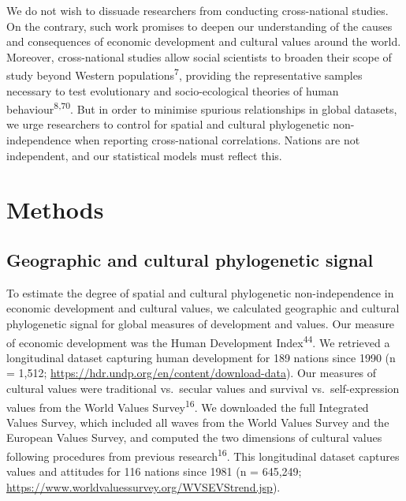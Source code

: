 \documentclass[english,man,floatsintext]{apa6}
\begin{document}
We do not wish to dissuade researchers from conducting cross-national studies. On the contrary, such work promises to deepen our understanding of the causes and consequences of economic development and cultural values around the world. Moreover, cross-national studies allow social scientists to broaden their scope of study beyond Western populations\textsuperscript{7}, providing the representative samples necessary to test evolutionary and socio-ecological theories of human behaviour\textsuperscript{8,70}. But in order to minimise spurious relationships in global datasets, we urge researchers to control for spatial and cultural phylogenetic non-independence when reporting cross-national correlations. Nations are not independent, and our statistical models must reflect this.

\hypertarget{methods}{%
\section{Methods}\label{methods}}

\hypertarget{geographic-and-cultural-phylogenetic-signal}{%
\subsection{Geographic and cultural phylogenetic signal}\label{geographic-and-cultural-phylogenetic-signal}}

To estimate the degree of spatial and cultural phylogenetic non-independence in economic development and cultural values, we calculated geographic and cultural phylogenetic signal for global measures of development and values. Our measure of economic development was the Human Development Index\textsuperscript{44}. We retrieved a longitudinal dataset capturing human development for 189 nations since 1990 (n = 1,512; \url{https://hdr.undp.org/en/content/download-data}). Our measures of cultural values were traditional vs.~secular values and survival vs.~self-expression values from the World Values Survey\textsuperscript{16}. We downloaded the full Integrated Values Survey, which included all waves from the World Values Survey and the European Values Survey, and computed the two dimensions of cultural values following procedures from previous research\textsuperscript{16}. This longitudinal dataset captures values and attitudes for 116 nations since 1981 (n = 645,249; \url{https://www.worldvaluessurvey.org/WVSEVStrend.jsp}).
\end{document}
